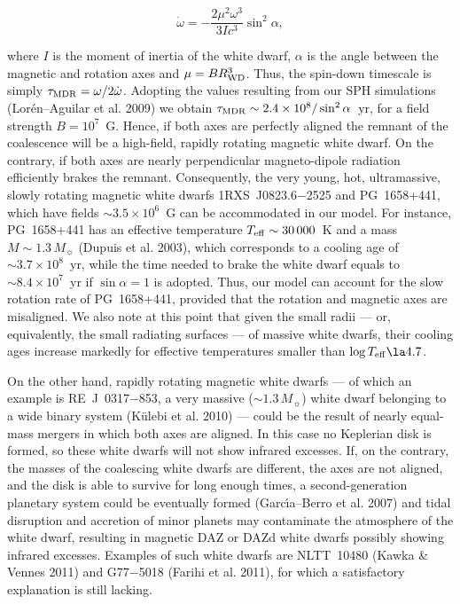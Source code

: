 \documentclass[]{emulateapj}
\begin{document}
\begin{equation}
 \dot{\omega} = -\frac{2\mu^2 \omega^3}{3Ic^3}\sin^2\alpha,
\end{equation}

\noindent  where $I$  is the  moment of  inertia of  the  white dwarf,
$\alpha$  is the  angle between  the  magnetic and  rotation axes  and
$\mu=BR_{\rm  WD}^3$.    Thus,  the  spin-down   timescale  is  simply
$\tau_{\rm MDR}=\omega / 2\dot{\omega}$. Adopting the values resulting
from  our SPH  simulations (Lor\'en--Aguilar  et al.  2009)  we obtain
$\tau_{\rm  MDR}\sim  2.4\times10^{8}/\sin^2\alpha$~yr,  for  a  field
strength $B=10^{7}$~G.  Hence, if  both axes are perfectly aligned the
remnant  of the  coalescence will  be a  high-field,  rapidly rotating
magnetic  white dwarf.   On  the  contrary, if  both  axes are  nearly
perpendicular   magneto-dipole   radiation   efficiently  brakes   the
remnant.  Consequently,  the  very  young, hot,  ultramassive,  slowly
rotating  magnetic white  dwarfs 1RXS~J0823.6$-$2525  and PG~1658+441,
which have fields $\sim 3.5  \times 10^6$~G can be accommodated in our
model.  For instance, PG~1658+441 has an effective temperature $T_{\rm
eff}\sim 30\, 000$~K and a  mass $M\sim 1.3\, M_{\sun}$ (Dupuis et al.
2003), which corresponds to a cooling age of $\sim 3.7\times 10^8$~yr,
while  the  time needed  to  brake the  white  dwarf  equals to  $\sim
8.4\times 10^7$~yr if $\sin\alpha=1$  is adopted.  Thus, our model can
account for the  slow rotation rate of PG~1658+441,  provided that the
rotation and magnetic axes are misaligned.  We also note at this point
that given the  small radii --- or, equivalently,  the small radiating
surfaces  --- of  massive white  dwarfs, their  cooling  ages increase
markedly for effective temperatures smaller than $\log T_{\rm eff} \la
4.7$.

On the other hand, rapidly rotating magnetic white dwarfs --- of which
an example is RE~J~0317$-$853,  a very massive ($\sim 1.3\, M_{\sun}$)
white dwarf belonging to a  wide binary system (K\"ulebi et al.  2010)
--- could be  the result  of nearly equal-mass  mergers in  which both
axes are aligned.  In this case  no Keplerian disk is formed, so these
white dwarfs  will not show  infrared excesses.  If, on  the contrary,
the masses of the coalescing  white dwarfs are different, the axes are
not aligned, and the disk is  able to survive for long enough times, a
second-generation   planetary  system   could  be   eventually  formed
(Garc\'\i a--Berro et al.  2007) and tidal disruption and accretion of
minor  planets may  contaminate  the atmosphere  of  the white  dwarf,
resulting  in  magnetic DAZ  or  DAZd  white  dwarfs possibly  showing
infrared  excesses.   Examples of  such  white  dwarfs are  NLTT~10480
(Kawka \& Vennes 2011) and G77$-$5018 (Farihi et al.  2011), for which
a satisfactory explanation is still lacking.
\end{document}
